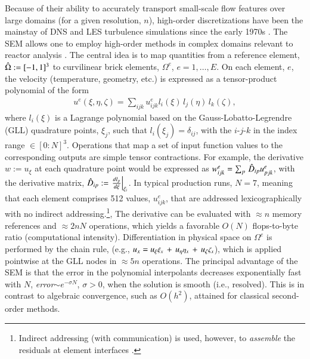 Because of their ability to accurately transport small-scale flow features over
large domains (for a given resolution, $n$), high-order discretizations have
been the mainstay of DNS and LES turbulence simulations since the early 1970s 
\cite{kreiss72,sao72}.   The SEM allows one to employ high-order methods in 
complex domains relevant to reactor analysis  \cite{pat84,sao80}.   
The central idea is to map
quantities from a reference element, ${\hat \Omega}:=[-1,1]^3$ to curvilinear brick
elements, $\Omega^e$, $e=1,\dots,E$.  On each element, $e$, the velocity
(temperature, geometry, etc.) is expressed as a tensor-product polynomial
of the form
\begin{eqnarray}
  u^e(\xi,\eta,\zeta) = \sum_{ijk} u_{ijk}^e l_i(\xi) \, l_j(\eta) \, l_k(\zeta),
\end{eqnarray}
where $l_i(\xi)$ is a Lagrange polynomial based on the Gauss-Lobatto-Legrendre
(GLL) quadrature points, $\xi_j$, such that $l_i(\xi_j)=\delta_{ij}$, with the
$i$-$j$-$k$ in the index range $\in [0:N]^3$.  Operations that map a set of input
function values to the corresponding outputs are simple tensor contractions.
For example, the derivative $w := u_{\xi}$ at each quadrature point would be
expressed as $w^e_{ijk} = \sum_p \, {\hat D}_{ip} u_{pjk}^e$, with the derivative
matrix, ${\hat D}_{ip} := \left. \frac{d l_p}{d \xi} \right|_{\xi_i}$.   
In typical production runs, $N=7$, meaning that each element comprises 512
values, $u_{ijk}^e$, that are addressed lexicographically with no indirect
addressing.\footnote{Indirect addressing (with communication) is used,
however, to {\em assemble} the residuals at element interfaces \cite{dfm02}.},
The derivative can be evaluated with $\approx n$ memory references and
$\approx 2nN$ operations, which yields a favorable $O(N)$ flops-to-byte ratio 
(computational intensity).
Differentiation in physical space on $\Omega^e$ is performed by the chain rule, 
(e.g., $u_x = 
u_{\xi}   \mbox{\footnotesize $\xi_x$}    \,+\, 
u_{\eta}  \mbox{\footnotesize $\eta_x$}   \,+\, 
u_{\zeta} \mbox{\footnotesize $\zeta_x$}  $), 
which is applied pointwise at the GLL nodes in $\approx 5n$ operations.  
The principal advantage of the SEM is that the error in the polynomial
interpolants decreases exponentially fast with $N$, {\em error}$\sim e^{-\sigma
N}$, $\sigma > 0$, when the solution is smooth (i.e., resolved).
This is in contrast to algebraic convergence, such as $O(h^2)$, attained
for classical second-order methods.




